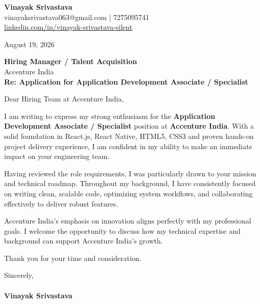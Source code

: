 \documentclass[11pt,a4paper]{article}
\begin{document}
\thispagestyle{empty}

{\Large \textbf{Vinayak Srivastava}}\\
vinayaksrivastava063@gmail.com | 7275095741 \\
\url{linkedin.com/in/vinayak-srivastava-silent}

\vspace{1em}
\hfill August 19, 2026

\textbf{Hiring Manager / Talent Acquisition}\\
Accenture India\\

\vspace{1.5em}
\textbf{Re: Application for Application Development Associate / Specialist}

\vspace{1em}
Dear Hiring Team at Accenture India,

I am writing to express my strong enthusiasm for the \textbf{Application Development Associate / Specialist} position at \textbf{Accenture India}. With a solid foundation in React.js, React Native, HTML5, CSS3 and proven hands-on project delivery experience, I am confident in my ability to make an immediate impact on your engineering team.

Having reviewed the role requirements, I was particularly drawn to your mission and technical roadmap. Throughout my background, I have consistently focused on writing clean, scalable code, optimizing system workflows, and collaborating effectively to deliver robust features.

Accenture India's emphasis on innovation aligns perfectly with my professional goals. I welcome the opportunity to discuss how my technical expertise and background can support Accenture India's growth.

Thank you for your time and consideration.

\vspace{1.5em}
Sincerely,\\
\vspace{1em}\\
\textbf{Vinayak Srivastava}
\end{document}
